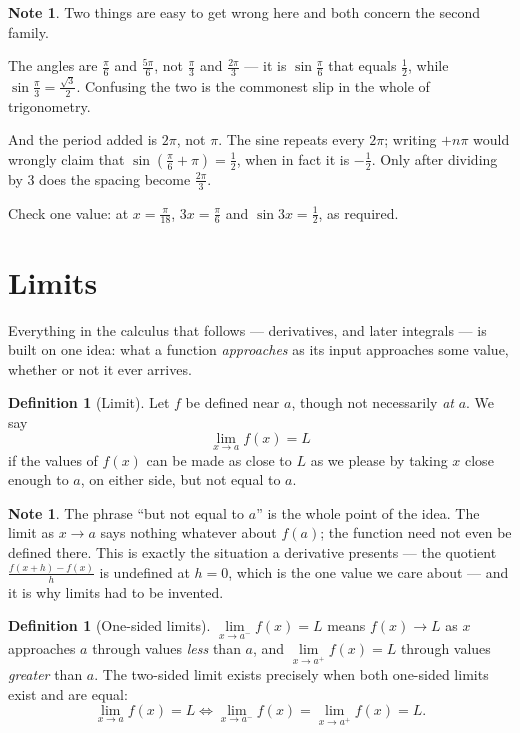 \documentclass[11pt,a4paper]{article}
\theoremstyle{definition}
\newtheorem{definition}[thm]{Definition}
\newtheorem{note}[thm]{Note}
\begin{document}
\begin{note}
Two things are easy to get wrong here and both concern the second family.

The angles are $\frac{\pi}{6}$ and $\frac{5\pi}{6}$, not $\frac{\pi}{3}$ and
$\frac{2\pi}{3}$ --- it is $\sin\frac{\pi}{6}$ that equals $\frac{1}{2}$, while
$\sin\frac{\pi}{3}=\frac{\sqrt{3}}{2}$. Confusing the two is the commonest slip in
the whole of trigonometry.

And the period added is $2\pi$, not $\pi$. The sine repeats every $2\pi$; writing
$+n\pi$ would wrongly claim that $\sin\left(\frac{\pi}{6}+\pi\right)=\frac{1}{2}$,
when in fact it is $-\frac{1}{2}$. Only after dividing by $3$ does the spacing
become $\frac{2\pi}{3}$.

Check one value: at $x=\frac{\pi}{18}$, $3x=\frac{\pi}{6}$ and
$\sin 3x=\frac{1}{2}$, as required.
\end{note}

\pagebreak
\section{Limits}
Everything in the calculus that follows --- derivatives, and later integrals --- is
built on one idea: what a function \emph{approaches} as its input approaches some
value, whether or not it ever arrives.

\begin{definition}[Limit]
Let $f$ be defined near $a$, though not necessarily \emph{at} $a$. We say
$$\lim_{x\to a}f(x)=L$$
if the values of $f(x)$ can be made as close to $L$ as we please by taking $x$
close enough to $a$, on either side, but not equal to $a$.
\end{definition}

\begin{note}
The phrase ``but not equal to $a$'' is the whole point of the idea. The limit as
$x\to a$ says nothing whatever about $f(a)$; the function need not even be defined
there. This is exactly the situation a derivative presents --- the quotient
$\frac{f(x+h)-f(x)}{h}$ is undefined at $h=0$, which is the one value we care
about --- and it is why limits had to be invented.
\end{note}

\begin{definition}[One-sided limits]
$\lim\limits_{x\to a^{-}}f(x)=L$ means $f(x)\to L$ as $x$ approaches $a$ through
values \emph{less} than $a$, and $\lim\limits_{x\to a^{+}}f(x)=L$ through values
\emph{greater} than $a$. The two-sided limit exists precisely when both one-sided
limits exist and are equal:
$$\lim_{x\to a}f(x)=L \iff
\lim_{x\to a^{-}}f(x)=\lim_{x\to a^{+}}f(x)=L .$$
\end{definition}
\end{document}
